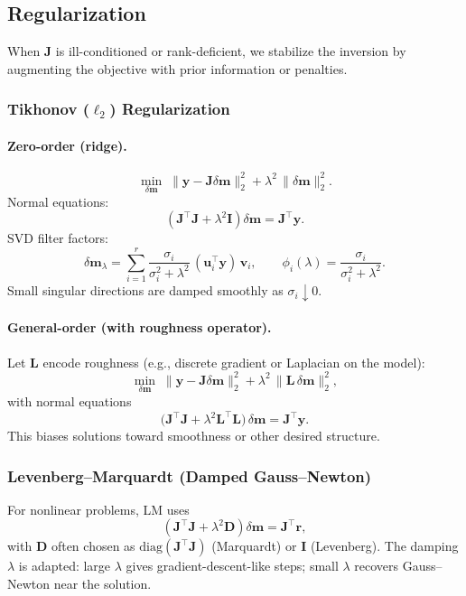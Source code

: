 \documentclass[11pt,a4paper]{article}
\begin{document}
\subsection{Regularization}\label{subsec:reg}
When $\mathbf{J}$ is ill-conditioned or rank-deficient, we stabilize the inversion by augmenting the objective with prior information or penalties.

\subsubsection{Tikhonov ($\ell_2$) Regularization}
\paragraph{Zero-order (ridge).}
\[
\min_{\delta\mathbf{m}} \; \|\mathbf{y}-\mathbf{J}\delta\mathbf{m}\|_2^2 + \lambda^2 \,\|\delta\mathbf{m}\|_2^2.
\]
Normal equations:
\[
\left(\mathbf{J}^\top \mathbf{J} + \lambda^2 \mathbf{I}\right)\delta\mathbf{m} = \mathbf{J}^\top \mathbf{y}.
\]
SVD filter factors:
\[
\delta\mathbf{m}_\lambda = \sum_{i=1}^r \frac{\sigma_i}{\sigma_i^2+\lambda^2}\,(\mathbf{u}_i^\top \mathbf{y})\,\mathbf{v}_i,
\qquad
\phi_i(\lambda)=\frac{\sigma_i}{\sigma_i^2+\lambda^2}.
\]
Small singular directions are damped smoothly as $\sigma_i \downarrow 0$.

\paragraph{General-order (with roughness operator).}
Let $\mathbf{L}$ encode roughness (e.g., discrete gradient or Laplacian on the model):
\[
\min_{\delta\mathbf{m}} \; \|\mathbf{y}-\mathbf{J}\delta\mathbf{m}\|_2^2 + \lambda^2 \,\|\mathbf{L}\,\delta\mathbf{m}\|_2^2,
\]
with normal equations
\[
\big(\mathbf{J}^\top \mathbf{J} + \lambda^2 \mathbf{L}^\top \mathbf{L}\big)\,\delta\mathbf{m} = \mathbf{J}^\top \mathbf{y}.
\]
This biases solutions toward smoothness or other desired structure.

\subsubsection{Levenberg--Marquardt (Damped Gauss--Newton)}
For nonlinear problems, LM uses
\[
\left(\mathbf{J}^\top\mathbf{J} + \lambda^2 \mathbf{D}\right)\delta\mathbf{m} = \mathbf{J}^\top \mathbf{r},
\]
with $\mathbf{D}$ often chosen as $\mathrm{diag}(\mathbf{J}^\top \mathbf{J})$ (Marquardt) or $\mathbf{I}$ (Levenberg). The damping $\lambda$ is adapted: large $\lambda$ gives gradient-descent-like steps; small $\lambda$ recovers Gauss--Newton near the solution.
\end{document}
